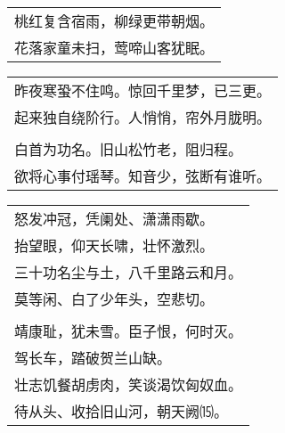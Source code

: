 \nopagebreak%
\nopagebreak%
\noindent\begin{minipage}{\linewidth}
  \vskip-3pt\begin{table}[H]
    \centering
    \begin{tabular}{@{}l@{}}
桃红复含宿雨，柳绿更带朝烟。\\
花落家童未扫，莺啼山客犹眠。
    \end{tabular}
  \end{table}
\end{minipage}
\vspace{1cm}


\nopagebreak%
\nopagebreak%
\noindent\begin{minipage}{\linewidth}
  \vskip-3pt\begin{table}[H]
    \centering
    \begin{tabular}{@{}l@{}}
昨夜寒蛩不住鸣。惊回千里梦，已三更。\\
起来独自绕阶行。人悄悄，帘外月胧明。\\
\\
白首为功名。旧山松竹老，阻归程。\\
欲将心事付瑶琴。知音少，弦断有谁听。
    \end{tabular}
  \end{table}
\end{minipage}
\vspace{1cm}


\nopagebreak%
\nopagebreak%
\noindent\begin{minipage}{\linewidth}
  \vskip-3pt\begin{table}[H]
    \centering
    \begin{tabular}{@{}l@{}}
怒发冲冠，凭阑处、潇潇雨歇。\\
抬望眼，仰天长啸，壮怀激烈。\\
三十功名尘与土，八千里路云和月。\\
莫等闲、白了少年头，空悲切。\\
\\
靖康耻，犹未雪。臣子恨，何时灭。\\
驾长车，踏破贺兰山缺。\\
壮志饥餐胡虏肉，笑谈渴饮匈奴血。\\
待从头、收拾旧山河，朝天阙⒂。
    \end{tabular}
  \end{table}
\end{minipage}
\vspace{1cm}


